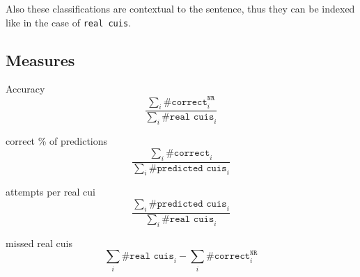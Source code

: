Also these classifications are contextual to the sentence, thus they can be indexed like in the case of \texttt{real cuis}.

\subsection{Measures}

Accuracy
\begin{equation}
\frac{\sum_{i}{\texttt{\#correct}_{i}^{\texttt{NR}}}}{\sum_{i}{\texttt{\#real cuis}_{i}}}
\end{equation}

correct \% of predictions
\begin{equation}
\frac{\sum_{i}{\texttt{\#correct}_{i}}}{\sum_{i}{\texttt{\#predicted cuis}_{i}}}
\end{equation}

attempts per real cui
\begin{equation}
\frac{\sum_{i}{\texttt{\#predicted cuis}_{i}}}{\sum_{i}{\texttt{\#real cuis}_{i}}}
\end{equation}

missed real cuis
\begin{equation}
\sum_{i}{\texttt{\#real cuis}_{i}} - \sum_{i}{\texttt{\#correct}^{\texttt{NR}}_{i}}
\end{equation}